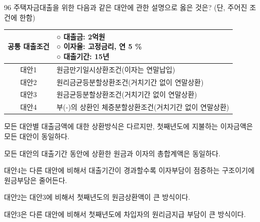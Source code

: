 \begin{question}{96}
주택자금대출을 위한 다음과 같은 대안에 관한 설명으로 옳은 것은? (단, 주어진 조건에 한함) \par
{\small\centering
\begin{tabular}{|c|l|}
\hline
공통 대출조건 & \makecell[l]{○ 대출금: 2억원 \\ ○ 이자율: 고정금리, 연 5 \% \\ ○ 대출기간: 15년} \\
\hline
대안1 & 원금만기일시상환조건(이자는 연말납입) \\
\hline
대안2 & 원리금균등분할상환조건(거치기간 없이 연말상환) \\
\hline
대안3 & 원금균등분할상환조건(거치기간 없이 연말상환) \\
\hline
대안4 & 부(-)의 상환인 체증분할상환조건(거치기간 없이 연말상환) \\
\hline
\end{tabular}\par}

\begin{choices}
  \item 모든 대안별 대출금액에 대한 상환방식은 다르지만, 첫째년도에 지불하는 이자금액은 모든 대안이 동일하다.
  \item 모든 대안의 대출기간 동안에 상환한 원금과 이자의 총합계액은 동일하다.
  \item 대안4는 다른 대안에 비해서 대출기간이 경과할수록 이자부담이 점증하는 구조이기에 원금부담은 줄어든다.
  \item 대안2는 대안3에 비해서 첫째년도의 원금상환액이 큰 방식이다.
  \item 대안3은 다른 대안에 비해서 첫째년도에 차입자의 원리금지급 부담이 큰 방식이다.
\end{choices}
\end{question}

